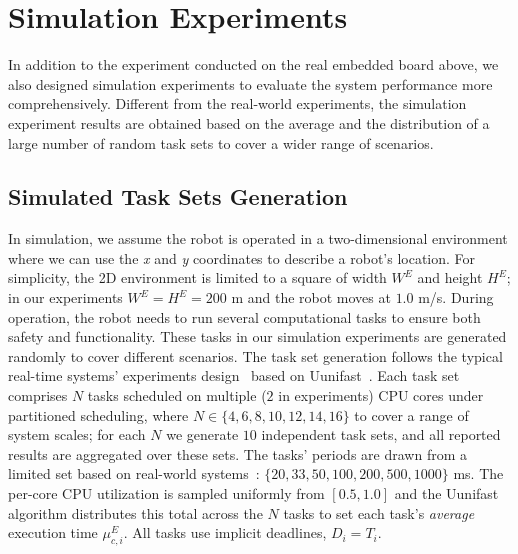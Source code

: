     \section{Simulation Experiments}
    \label{section: simulation}
    In addition to the experiment conducted on the real embedded board above, we also designed simulation experiments to evaluate the system performance more comprehensively. Different from the real-world experiments, the simulation experiment results are obtained based on the average and the distribution of a large number of random task sets to cover a wider range of scenarios.
    
    \subsection{Simulated Task Sets Generation}


    In simulation, we assume the robot is operated in a two-dimensional environment where we can use the \textit{x} and \textit{y} coordinates to describe a robot's location.
    For simplicity, the 2D environment is limited to a square of width $W^E$ and height $H^E$; in our experiments $W^E = H^E = 200$ m and the robot moves at $1.0$ m/s.
    During operation, the robot needs to run several computational tasks to ensure both safety and functionality. These tasks in our simulation experiments are generated randomly to cover different scenarios. The task set generation follows the typical real-time systems' experiments design~\cite{Wang2023RTAS, Zhao2020AnOF} based on Uunifast~\cite{Davis2008EfficientES}.
    Each task set comprises $N$ tasks scheduled on multiple ($2$ in experiments) CPU cores under partitioned scheduling, where $N \in \{4, 6, 8, 10, 12, 14, 16\}$ to cover a range of system scales; for each $N$ we generate $10$ independent task sets, and all reported results are aggregated over these sets.
    The tasks' periods are drawn from a limited set based on real-world systems~\cite{Percept21_RTSS, Kramer15benchmark}: $\{20, 33, 50, 100, 200, 500, 1000\}$ ms.
    The per-core CPU utilization is sampled uniformly from $[0.5, 1.0]$ and the Uunifast algorithm distributes this total across the $N$ tasks to set each task's \textit{average} execution time $\mu^E_{c,i}$.
    All tasks use implicit deadlines, $D_i = T_i$.

